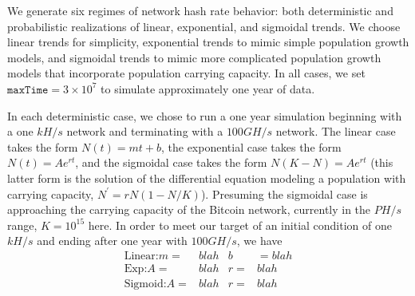 \documentclass[12pt,english]{mrl}
\theoremstyle{definition}
\numberwithin{equation}{section}
\numberwithin{figure}{section}
\numberwithin{equation}{section}
\numberwithin{equation}{section}
\numberwithin{figure}{section}
\begin{document}
We generate six regimes of network hash rate behavior: both deterministic and probabilistic realizations of linear, exponential, and sigmoidal trends. We choose linear trends for simplicity, exponential trends to mimic simple population growth models, and sigmoidal trends to mimic more complicated population growth models that incorporate population carrying capacity. In all cases, we set $\texttt{maxTime} = 3\times 10^7$ to simulate approximately one year of data.

In each deterministic case, we chose to run a one year simulation beginning with a one $kH/s$ network and terminating with a $100 GH/s$ network. The linear case takes the form $N(t)= mt + b$, the exponential case takes the form $N(t) = A e^{rt}$, and the sigmoidal case takes the form $N\left(K - N\right) = Ae^{rt}$ (this latter form is the solution of the differential equation modeling a population with carrying capacity, $N^{\prime} = rN(1-N/K)$). Presuming the sigmoidal case is approaching the carrying capacity of the Bitcoin network, currently in the $PH/s$ range, $K=10^15$ here. In order to meet our target of an initial condition of one $kH/s$ and ending after one year with $100 GH/s$, we have
\begin{align*}
\text{Linear:} m =& blah & b &= blah\\
\text{Exp:} A=& blah & r =& blah\\
\text{Sigmoid:} A=& blah & r =& blah
\end{align*}
\end{document}
